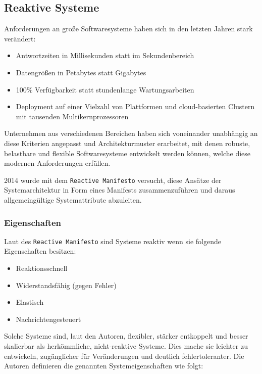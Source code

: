 \subsection{Reaktive Systeme}
\label{subsection:reaktive_systeme}
Anforderungen an große Softwaresysteme haben sich in den letzten Jahren stark verändert:
\begin{itemize}
  \item Antwortzeiten in Millisekunden statt im Sekundenbereich
  \item Datengrößen in Petabytes statt Gigabytes
  \item 100\% Verfügbarkeit statt stundenlange Wartungsarbeiten
  \item Deployment auf einer Vielzahl von Plattformen und cloud-basierten Clustern mit tausenden Multikernprozessoren
\end{itemize}

Unternehmen aus verschiedenen Bereichen haben sich voneinander unabhängig an diese Kriterien angepasst und Architekturmuster
erarbeitet, mit denen robuste, belastbare und flexible Softwaresysteme entwickelt werden können, welche diese modernen Anforderungen
erfüllen.

2014 wurde mit dem \verb|Reactive Manifesto| versucht, diese Ansätze der Systemarchitektur in Form eines Manifests zusammenzuführen
und daraus allgemeingültige Systemattribute abzuleiten.

\subsubsection{Eigenschaften}
\label{subsubsec:reaktive_systeme_eigenschaften}
Laut des \verb|Reactive Manifesto| sind Systeme reaktiv wenn sie folgende Eigenschaften besitzen:
\begin{itemize}
  \item Reaktionsschnell
  \item Widerstandsfähig (gegen Fehler)
  \item Elastisch
  \item Nachrichtengesteuert
\end{itemize}
Solche Systeme sind, laut den Autoren, flexibler, stärker entkoppelt und besser skalierbar als herkömmliche, nicht-reaktive Systeme.
Dies mache sie leichter zu entwickeln, zugänglicher für Veränderungen und deutlich fehlertoleranter.
\newline\newline
Die Autoren definieren die genannten Systemeigenschaften wie folgt:
